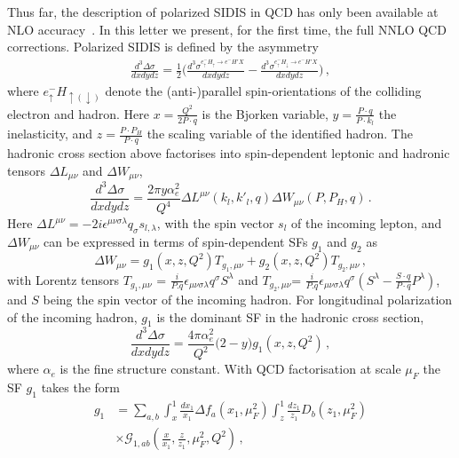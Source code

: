 \documentclass[%
 twocolumn,
 superscriptaddress,
 preprintnumbers,
 nofootinbib,
 amsmath,amssymb,
 aps,
 prl,
]{revtex4}
\begin{document}
Thus far, the description of polarized SIDIS in QCD has only been available at NLO  accuracy~\cite{deFlorian:1997zj}. 
In this letter we present, for the first time, the full NNLO QCD corrections. 
Polarized SIDIS is defined by the asymmetry
%
\begin{align*}
\frac{d^3 \Delta \sigma}{dx dy dz}  
 =
\frac{1}{2}\Bigg(
\frac{d^3 \sigma^{e^{-}_{\uparrow }H_{\uparrow}\rightarrow e^{-} H'X}}{dx dy dz}
-\frac{d^3 \sigma^{e^{-}_{\uparrow} H_{\downarrow}\rightarrow e^{-} H'X}}{dx dy dz}\Bigg)
\, ,
\end{align*}
%
where $e^{-}_{\uparrow }H_{\uparrow(\downarrow)}$ denote the (anti-)parallel spin-orientations of the colliding electron and hadron.
Here $x=\frac{Q^2}{2 P \cdot q}$ is the Bjorken variable, 
$y=\frac{P\cdot q}{P\cdot k_l}$ the inelasticity, 
and $z= \frac{P \cdot P_H}{P \cdot q}$ the scaling variable of the identified hadron.
%
The hadronic cross section above factorises into spin-dependent leptonic and hadronic tensors  $\Delta L_{\mu \nu}$
and $\Delta W_{\mu \nu}$,
%
\begin{equation}
\frac{d^3\Delta \sigma}{dxdydz} =\frac{2\pi y \alpha_e^{2}}{Q^4}\Delta L^{\mu\nu}(k_l,k'_l,q)\Delta W_{\mu\nu}(P,P_H,q)\, .
\end{equation}
%
Here $\Delta L^{\mu\nu}= -2 i \epsilon^{\mu \nu \sigma \lambda} q_\sigma s_{l,\lambda}$, 
with the spin vector $s_l$ of the incoming lepton, and $\Delta W_{\mu\nu}$ can be expressed in terms of spin-dependent SFs $g_1$ and $g_2$ as 
%
\begin{equation}
\Delta W_{\mu\nu} = g_1 (x,z,Q^2)T_{g_1,\mu \nu} + g_2 (x,z,Q^2) T_{g_2,\mu \nu}
\, ,
\end{equation}
%
with Lorentz tensors $T_{g_1,\mu\nu}$ = $\frac{i}{P.q} \epsilon_{\mu \nu \sigma \lambda} q^\sigma S^\lambda$ and 
$T_{g_2,\mu\nu}$= $\frac{i}{P.q} \epsilon_{\mu \nu \sigma \lambda} q^\sigma  (S^\lambda - \frac{S\cdot q}{P\cdot q }P^\lambda)$, and 
$S$ being the spin vector of the incoming hadron.
For longitudinal polarization of the incoming hadron, $g_1$ is the dominant SF in the hadronic cross section,
%
\begin{equation}    
\frac{d^3\Delta \sigma}{dxdydz} = \frac{4\pi\alpha_e^2}{Q^2} \big(2-y\big)g_1 (x,z,Q^2)\, ,
\end{equation}
%
where $\alpha_e$ is the fine structure constant.  
With QCD factorisation at scale $\mu_F$ the SF $g_1$ takes the form
%
\begin{align}
\label{eq:SFdef}
g_1 &= \sum_{a,b}\int_x^1 \frac{dx_1}{x_1} \Delta f_a(x_1,\mu_F^2) \int_z^1 \frac{dz_1}{z_1} D_b(z_1,\mu_F^2) 
\nonumber \\
    & \times \mathcal{G}_{1,ab}\left( \frac{x}{x_1}, \frac{z}{z_1}, \mu_F^2, Q^2\right )
\, ,
\end{align}
\end{document}
